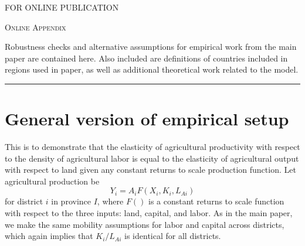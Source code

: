 \documentclass[11pt]{article}
\begin{document}
\begin{titlepage}
\hfill \textsc{FOR ONLINE PUBLICATION}

\vspace{1in} \noindent {\large \today}

\vspace{.5in} 





\vspace{2in} \noindent \textsc{Online Appendix} \hrulefill

\vspace{.05in} \noindent Robustness checks and alternative assumptions for empirical work from the main paper are contained here. Also included are definitions of countries included in regions used in paper, as well as additional theoretical work related to the model.
\vspace{.1in} \hrule

\end{titlepage}

\pagebreak 

\tableofcontents

\section{General version of empirical setup}
This is to demonstrate that the elasticity of agricultural productivity with respect to the density of agricultural labor is equal to the elasticity of agricultural output with respect to land given any constant returns to scale production function. Let agricultural production be
\begin{equation}
    Y_i = A_i F(X_i,K_i,L_{Ai}) 
\end{equation}
for district $i$ in province $I$, where $F()$ is a constant returns to scale function with respect to the three inputs: land, capital, and labor. As in the main paper, we make the same mobility assumptions for labor and capital across districts, which again implies that $K_i/L_{Ai}$ is identical for all districts. 
\end{document}
